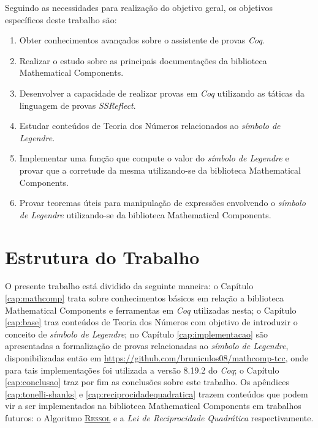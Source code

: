 Seguindo as necessidades para realização do objetivo geral, os objetivos específicos deste trabalho são:

\begin{enumerate}
    \item \label{item:obj-esp-1} Obter conhecimentos avançados sobre o assistente de provas \textit{Coq}.
    \item \label{item:obj-esp-2} Realizar o estudo sobre as principais documentações da biblioteca Mathematical Components.
    \item \label{item:obj-esp-3} Desenvolver a capacidade de realizar provas em \textit{Coq} utilizando as táticas da linguagem de provas \textit{SSReflect}.
    \item \label{item:obj-esp-4} Estudar conteúdos de Teoria dos Números relacionados ao \textit{símbolo de Legendre}.
    \item \label{obj:func} Implementar uma função que compute o valor do \textit{símbolo de Legendre} e provar que a corretude da mesma utilizando-se da biblioteca Mathematical Components.
    \item \label{obj:proofs} Provar teoremas úteis para manipulação de expressões envolvendo o \textit {símbolo de Legendre} utilizando-se da biblioteca Mathematical Components.
\end{enumerate}
 
\section{Estrutura do Trabalho}

O presente trabalho está dividido da seguinte maneira: o Capítulo \ref{cap:mathcomp} trata sobre conhecimentos básicos em relação a biblioteca Mathematical Components e ferramentas em \textit{Coq} utilizadas nesta; o Capítulo \ref{cap:base} traz conteúdos de Teoria dos Números com objetivo de introduzir o conceito de \textit{símbolo de Legendre}; no Capítulo \ref{cap:implementacao} são apresentadas a formalização de provas relacionadas ao \textit{símbolo de Legendre}, disponibilizadas então em \url{https://github.com/bruniculos08/mathcomp-tcc}, onde para tais implementações foi utilizada a versão 8.19.2 do \textit{Coq}; o Capítulo \ref{cap:conclusao} traz por fim as conclusões sobre este trabalho. Os apêndices \ref{cap:tonelli-shanks} e \ref{cap:reciprocidadequadratica} trazem conteúdos que podem vir a ser implementados na biblioteca Mathematical Components em trabalhos futuros: o Algoritmo \hyperref[algo:ressol]{\textsc{Ressol}} e a \textit{Lei de Reciprocidade Quadrática} respectivamente.

